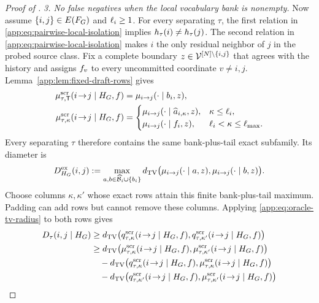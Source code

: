 \begin{proof}[Proof of \AppLowDegreeScreenRef]
\emph{3. No false negatives when the local vocabulary bank is nonempty.}
Now assume $\{i,j\}\in E(F_{G})$ and $\ell_{i}\ge1$.
For every separating $\tau$, the first relation in
\eqref{app:eq:pairwise-local-isolation} implies
$h_{\tau}(i)\ne h_{\tau}(j)$.
The second relation in \eqref{app:eq:pairwise-local-isolation} makes $i$
the only residual neighbor of $j$ in the probed source class.  Fix a complete
boundary $z\in\mathcal V^{[N]\setminus\{i,j\}}$ that agrees with the
history and assigns $f_{v}$ to every uncommitted coordinate
$v\ne i,j$.  Lemma~\ref{app:lem:fixed-draft-rows} gives
\begin{align}
 \mu^{\mathrm{scr}}_{\tau,\mathsf T}(i\!\to\!j\mid H_{G},f)
 &=\mu_{i\to j}(\cdot\mid b_{i},z),\notag\\
 \mu^{\mathrm{scr}}_{\tau,\kappa}(i\!\to\!j\mid H_{G},f)
 &=\begin{cases}
 \mu_{i\to j}(\cdot\mid \widehat a_{i,\kappa},z),
     &\kappa\le\ell_{i},\\
 \mu_{i\to j}(\cdot\mid f_{i},z),
     &\ell_{i}<\kappa\le\ell_{\max}.
 \end{cases}
 \label{app:eq:isolated-boundary-row-family}
\end{align}
Every separating $\tau$ therefore contains the same bank-plus-tail exact
subfamily.  Its diameter is
\begin{equation}
 D^{\mathrm{ex}}_{H_{G}}(i,j)
 :=\max_{a,b\in\widehat{\mathcal B}_{i}\cup\{b_{i}\}}
 d_{\mathrm{TV}}\bigl(\mu_{i\to j}(\cdot\mid a,z),
            \mu_{i\to j}(\cdot\mid b,z)\bigr).
 \label{app:eq:queried-exact-diameter}
\end{equation}
Choose columns $\kappa,\kappa'$ whose exact rows attain this finite
bank-plus-tail maximum.  Padding can add rows but cannot remove these
columns.  Applying \eqref{app:eq:oracle-tv-radius} to both rows gives
\begin{align*}
 \ScreenDiameter{\tau}{i}{j}
 &\ge\dTV\bigl(\ProbeObservedRow{\tau}{\kappa}{i}{j},
                  \ProbeObservedRow{\tau}{\kappa'}{i}{j}\bigr)\\
 &\ge\dTV\bigl(\ProbeExactRow{\tau}{\kappa}{i}{j},
                  \ProbeExactRow{\tau}{\kappa'}{i}{j}\bigr)\\
 &\quad-\dTV\bigl(\ProbeObservedRow{\tau}{\kappa}{i}{j},
                    \ProbeExactRow{\tau}{\kappa}{i}{j}\bigr)\\
 &\quad-\dTV\bigl(\ProbeObservedRow{\tau}{\kappa'}{i}{j},
                    \ProbeExactRow{\tau}{\kappa'}{i}{j}\bigr)\\

\end{align*}
\end{proof}
